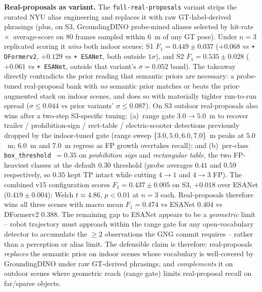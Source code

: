 \noindent\textbf{Real-proposals as variant.}
The \texttt{full-real-proposals} variant strips the curated NYU
alias engineering and replaces it with raw GT-label-derived
phrasings (plus, on S3, GroundingDINO probe-mined aliases selected
by hit-rate~$\times$~average-score on $80$ frames sampled within
$6$~m of any GT pose). Under $n{=}3$ replicated scoring it
\emph{wins} both indoor scenes: S1 $F_1{=}0.449 \pm 0.037$
($+0.068$ vs \texttt{+ DFormerv2}, $+0.129$ vs \texttt{+ ESANet},
both outside $1\sigma$), and S2 $F_1{=}0.535 \pm 0.028$
($+0.061$ vs \texttt{+ ESANet}, outside that variant's
$\sigma{=}0.052$ band). The takeaway directly contradicts the
prior reading that semantic priors are necessary: a probe-tuned
real-proposal bank with \emph{no} semantic prior matches or
beats the prior-augmented stack on indoor scenes, and does so
with materially tighter run-to-run spread ($\sigma{\leq}0.044$
vs prior variants' $\sigma{\leq}0.087$). On S3 outdoor real-proposals also wins after a two-step
S3-specific tuning: (a)~range gate $3.0 \rightarrow 5.0$~m to
recover trailer / prohibition-sign / rect-table / electric-scooter
detections previously dropped by the indoor-tuned gate (range
sweep \{$3.0, 5.0, 6.0, 7.0$\}~m peaks at $5.0$~m; $6.0$~m and
$7.0$~m regress as FP growth overtakes recall); and (b)~per-class
\texttt{box\_threshold}~$=0.35$ on \textit{prohibition sign} and
\textit{rectangular table}, the two FP-heaviest classes at the
default $0.30$ threshold (probe averages $0.41$ and $0.59$
respectively, so $0.35$ kept TP intact while cutting $4{\rightarrow}1$
and $4{\rightarrow}3$ FP). The combined v15 configuration scores
$F_1 = 0.437 \pm 0.005$ on S3, $+0.018$ over ESANet
($0.419 \pm 0.004$); Welch $t{\approx}4.86$, $p{<}0.01$ at $n{=}3$
each. Real-proposals therefore wins all three scenes with macro
mean $F_1 = 0.474$ vs ESANet $0.404$ vs DFormerv2 $0.388$. The remaining gap to ESANet appears to be a
\textit{geometric} limit -- robot trajectory must approach
within the range gate for any open-vocabulary detector to
accumulate the $\geq 2$ observations the GNG commit requires --
rather than a perception or alias limit. The defensible claim is therefore:
real-proposals \emph{replaces} the semantic prior on indoor
scenes whose vocabulary is well-covered by GroundingDINO under
raw GT-derived phrasings, and \emph{complements} it on outdoor
scenes where geometric reach (range gate) limits real-proposal
recall on far/sparse objects.

